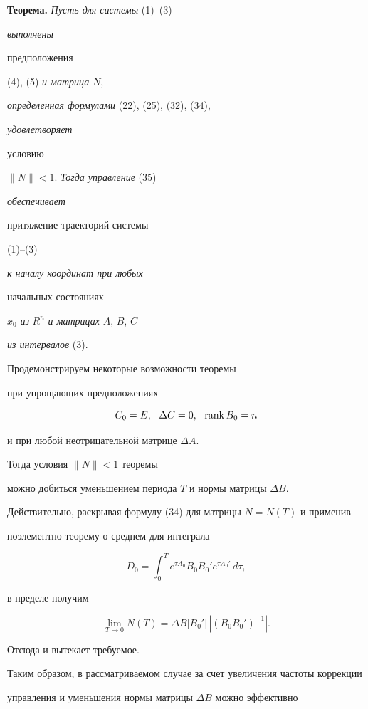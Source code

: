 \medskip





{\bf Теорема.} {\it Пусть для системы} (1)--(3) {\it выполнены


предположения} (4), (5) {\it и матрица} $N$,


{\it определенная формулами} (22), (25), (32), (34), {\it удовлетворяет


условию} $\| N \| < 1$. {\it Тогда управление} (35) {\it обеспечивает


притяжение траекторий системы} (1)--(3) {\it к началу координат при любых


начальных состояниях} $x_0$ {\it из} $R^n$ {\it и матрицах} $A$, $B$, $C$


{\it из интервалов} (3).


\medskip





Продемонстрируем некоторые возможности теоремы


при упрощающих предположениях 


$$


C_0=E, \ \  \Delta C=0, \ \ \rank B_0=n


$$


и при любой неотрицательной матрице $\Delta A$.


Тогда условия $\|N\| <1$ теоремы


можно добиться уменьшением периода $T$ и нормы матрицы $\Delta B$.


Действительно, раскрывая формулу (34) для матрицы $N=N(T)$ и применив


поэлементно теорему о среднем для интеграла


$$


D_0 = \int_0^T e^{\tau A_0}B_0 B_0'e^{\tau A_0'} \, d \tau,


$$


в пределе получим 


$$


\lim\limits_{T \to 0} N(T)= \Delta B |B_0'|\, |(B_0 B_0')^{-1}|.


$$


Отсюда и вытекает требуемое.





Таким образом, в рассматриваемом случае за счет увеличения частоты коррекции


управления и уменьшения нормы матрицы $ \Delta B$ можно эффективно 


